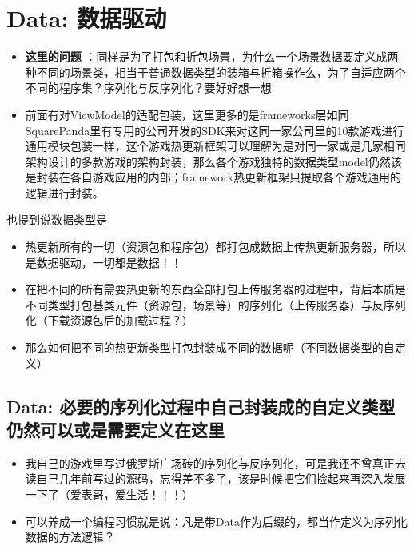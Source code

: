 \documentclass[9pt, b5paper]{article}
\begin{document}
\section{Data: 数据驱动}
\label{sec-10}
\begin{itemize}
\item \textbf{这里的问题} ：同样是为了打包和折包场景，为什么一个场景数据要定义成两种不同的场景类，相当于普通数据类型的装箱与折箱操作么，为了自适应两个不同的程序集？序列化与反序列化？要好好想一想
\item 前面有对ViewModel的适配包装，这里更多的是frameworks层如同SquarePanda里有专用的公司开发的SDK来对这同一家公司里的10款游戏进行通用模块包装一样，这个游戏热更新框架可以理解为是对同一家或是几家相同架构设计的多款游戏的架构封装，那么各个游戏独特的数据类型model仍然该是封装在各自游戏应用的内部；framework热更新框架只提取各个游戏通用的逻辑进行封装。
\end{itemize}
也提到说数据类型是
\begin{itemize}
\item 热更新所有的一切（资源包和程序包）都打包成数据上传热更新服务器，所以是数据驱动，一切都是数据！！
\item 在把不同的所有需要热更新的东西全部打包上传服务器的过程中，背后本质是不同类型打包基类元件（资源包，场景等）的序列化（上传服务器）与反序列化（下载资源包后的加载过程？）
\item 那么如何把不同的热更新类型打包封装成不同的数据呢（不同数据类型的自定义）　
\end{itemize}
\subsection{Data: 必要的序列化过程中自己封装成的自定义类型仍然可以或是需要定义在这里}
\label{sec-10-1}
\begin{itemize}
\item 我自己的游戏里写过俄罗斯广场砖的序列化与反序列化，可是我还不曾真正去读自己几年前写过的源码，忘得差不多了，该是时候把它们捡起来再深入发展一下了（爱表哥，爱生活！！！）
\item 可以养成一个编程习惯就是说：凡是带Data作为后缀的，都当作定义为序列化数据的方法逻辑？
\end{itemize}
\end{document}
